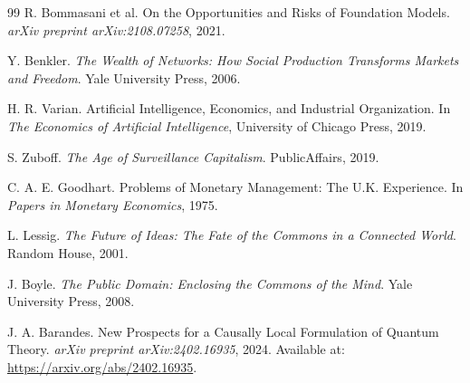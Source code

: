 \documentclass[12pt, oneside]{article}
\begin{document}
\begin{thebibliography}{99}
R. Bommasani et al.
\newblock On the Opportunities and Risks of Foundation Models.
\newblock \emph{arXiv preprint arXiv:2108.07258}, 2021.

Y. Benkler.
\newblock \emph{The Wealth of Networks: How Social Production Transforms Markets and Freedom}.
\newblock Yale University Press, 2006.

H. R. Varian.
\newblock Artificial Intelligence, Economics, and Industrial Organization.
\newblock In \emph{The Economics of Artificial Intelligence}, University of Chicago Press, 2019.

S. Zuboff.
\newblock \emph{The Age of Surveillance Capitalism}.
\newblock PublicAffairs, 2019.

C. A. E. Goodhart.
\newblock Problems of Monetary Management: The U.K. Experience.
\newblock In \emph{Papers in Monetary Economics}, 1975.

L. Lessig.
\newblock \emph{The Future of Ideas: The Fate of the Commons in a Connected World}.
\newblock Random House, 2001.

J. Boyle.
\newblock \emph{The Public Domain: Enclosing the Commons of the Mind}.
\newblock Yale University Press, 2008.

J. A. Barandes.
\newblock New Prospects for a Causally Local Formulation of Quantum Theory.
\newblock \emph{arXiv preprint arXiv:2402.16935}, 2024.
\newblock Available at: \url{https://arxiv.org/abs/2402.16935}.

\end{thebibliography}
\end{document}
